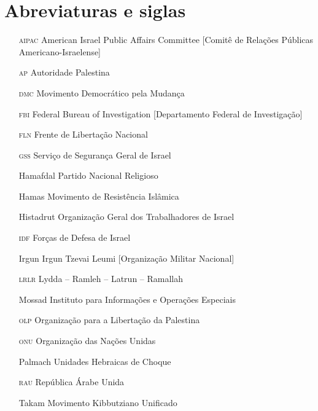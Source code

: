 \chapter{Abreviaturas e siglas}

\begin{enumerate}
\item[\textsc{aipac}] American Israel Public Affairs Committee [Comitê de Relações Públicas Americano-Israelense]

\item[\textsc{ap}] Autoridade Palestina

\item[\textsc{dmc}] Movimento Democrático pela Mudança

\item[\textsc{fbi}] Federal Bureau of Investigation [Departamento Federal de Investigação]

\item[\textsc{fln}] Frente de Libertação Nacional

\item[\textsc{gss}] Serviço de Segurança Geral de Israel

\item[Hamafdal] Partido Nacional Religioso

\item[Hamas] Movimento de Resistência Islâmica

\item[Histadrut] Organização Geral dos Trabalhadores de Israel

\item[\textsc{idf}] Forças de Defesa de Israel

\item[Irgun] Irgun Tzevai Leumi [Organização Militar Nacional]

\item[\textsc{lrlr}] Lydda -- Ramleh -- Latrun -- Ramallah

\item[Mossad] Instituto para Informações e Operações Especiais

\item[\textsc{olp}] Organização para a Libertação da Palestina

\item[\textsc{onu}] Organização das Nações Unidas

\item[Palmach] Unidades Hebraicas de Choque

\item[\textsc{rau}] República Árabe Unida

\item[Takam] Movimento Kibbutziano Unificado
\end{enumerate}






